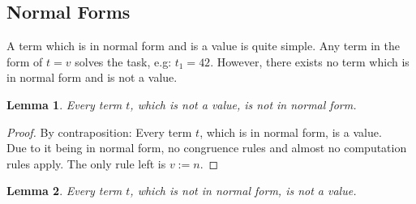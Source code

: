 \documentclass{article}
\newtheorem{lemma}{Lemma}
\begin{document}
\begin{prooftree}
\end{prooftree}

\subsection*{Normal Forms}

A term which is in normal form and is a value is quite simple. Any term in the form of $t = v$ solves the task, e.g: $t_1 = 42$. However, there exists no term which is in normal form and is not a value.

\begin{lemma}\label{normal-1}
Every term $t$, which is not a value, is not in normal form.
\end{lemma}

\begin{proof} By contraposition: Every term $t$, which is in normal form, is a value.\\
Due to it being in normal form, no congruence rules and almost no computation rules apply. The only rule left is $v := n$.
\end{proof}

\begin{lemma}\label{normal-2}
Every term $t$, which is not in normal form, is not a value.
\end{lemma}
\end{document}
